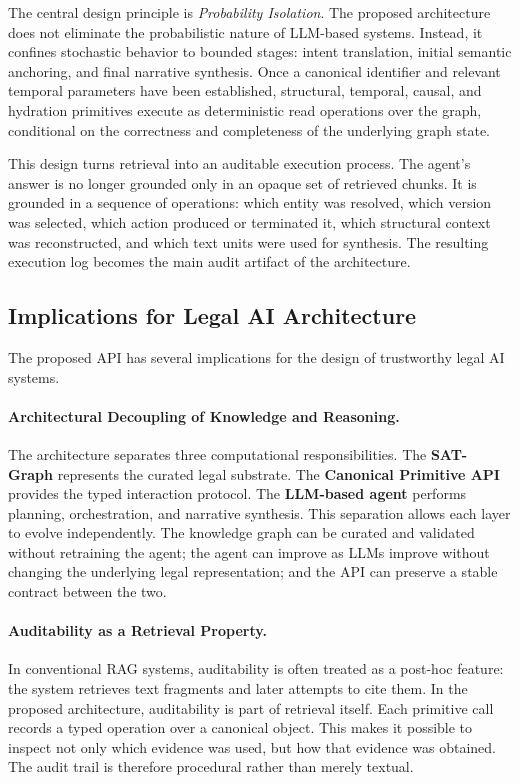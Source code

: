 \documentclass[11pt]{article}
\begin{document}
The central design principle is \textit{Probability Isolation}. The proposed architecture does not eliminate the probabilistic nature of LLM-based systems. Instead, it confines stochastic behavior to bounded stages: intent translation, initial semantic anchoring, and final narrative synthesis. Once a canonical identifier and relevant temporal parameters have been established, structural, temporal, causal, and hydration primitives execute as deterministic read operations over the graph, conditional on the correctness and completeness of the underlying graph state.

This design turns retrieval into an auditable execution process. The agent's answer is no longer grounded only in an opaque set of retrieved chunks. It is grounded in a sequence of operations: which entity was resolved, which version was selected, which action produced or terminated it, which structural context was reconstructed, and which text units were used for synthesis. The resulting execution log becomes the main audit artifact of the architecture.

\subsection{Implications for Legal AI Architecture}

The proposed API has several implications for the design of trustworthy legal AI systems.

\paragraph{Architectural Decoupling of Knowledge and Reasoning.}
The architecture separates three computational responsibilities. The \textbf{SAT-Graph} represents the curated legal substrate. The \textbf{Canonical Primitive API} provides the typed interaction protocol. The \textbf{LLM-based agent} performs planning, orchestration, and narrative synthesis. This separation allows each layer to evolve independently. The knowledge graph can be curated and validated without retraining the agent; the agent can improve as LLMs improve without changing the underlying legal representation; and the API can preserve a stable contract between the two.

\paragraph{Auditability as a Retrieval Property.}
In conventional RAG systems, auditability is often treated as a post-hoc feature: the system retrieves text fragments and later attempts to cite them. In the proposed architecture, auditability is part of retrieval itself. Each primitive call records a typed operation over a canonical object. This makes it possible to inspect not only which evidence was used, but how that evidence was obtained. The audit trail is therefore procedural rather than merely textual.
\end{document}
